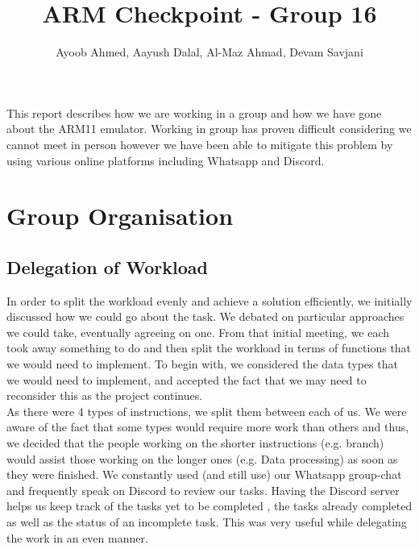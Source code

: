 \documentclass[10pt]{article}
\begin{document}
\title{\vspace{-2cm}ARM Checkpoint - Group 16}
\author{\small Ayoob Ahmed, Aayush Dalal, Al-Maz Ahmad, Devam Savjani}


\maketitle

This report describes how we are working in a group and how we have gone about the ARM11 emulator. Working in group has proven difficult considering we cannot meet in person however we have been able to mitigate this problem by using various online platforms including Whatsapp and Discord.
\section{Group Organisation}
\subsection{Delegation of Workload}
In order to split the workload evenly and achieve a solution efficiently, we initially discussed how we could go about the task. We debated on particular approaches we could take, eventually agreeing on one. From that initial meeting, we each took away something to do and then split the workload in terms of functions that we would need to implement. To begin with, we considered the data types that we would need to implement, and accepted the fact that we may need to reconsider this as the project continues. 
\\As there were 4 types of instructions, we split them between each of us. We were aware of the fact that some types would require more work than others and thus, we decided that the people working on the shorter instructions (e.g. branch) would assist those working on the longer ones (e.g. Data processing) as soon as they were finished. We constantly used (and still use) our Whatsapp group-chat and frequently speak on Discord to review our tasks. Having the Discord server helps us keep track of the tasks yet to be completed , the tasks already completed as well as the status of an incomplete task. This was very useful while delegating the work in an even manner.
\end{document}
